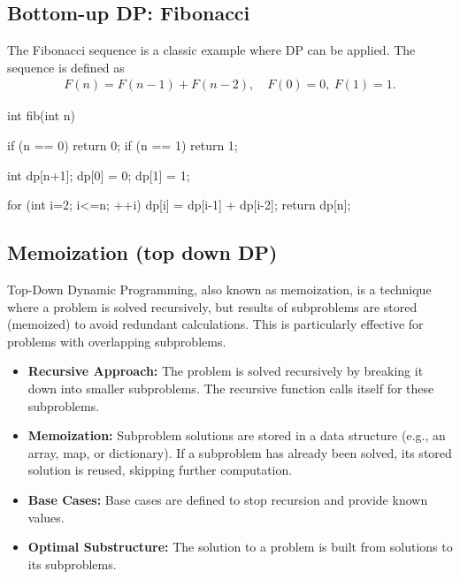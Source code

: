 \documentclass{report}
\begin{document}
\bigbreak \noindent 
\subsection{Bottom-up DP: Fibonacci}
\bigbreak \noindent 
The Fibonacci sequence is a classic example where DP can be applied. The sequence is defined as
\begin{align*}
    F(n) = F(n-1) + F(n-2), \quad F(0) = 0,\ F(1) = 1
.\end{align*}
\bigbreak \noindent 
\begin{cppcode}
    int fib(int n) {
        if (n == 0) return 0;
        if (n == 1) return 1;

        int dp[n+1];
        dp[0] = 0;
        dp[1] = 1;

        for (int i=2; i<=n; ++i) {
            dp[i] = dp[i-1] + dp[i-2];
        }
        return dp[n];
    }
\end{cppcode}

\bigbreak \noindent 
\subsection{Memoization (top down DP)}
\bigbreak \noindent 
Top-Down Dynamic Programming, also known as memoization, is a technique where a problem is solved recursively, but results of subproblems are stored (memoized) to avoid redundant calculations. This is particularly effective for problems with overlapping subproblems.
\bigbreak \noindent 
\begin{itemize}
    \item \textbf{Recursive Approach:} The problem is solved recursively by breaking it down into smaller subproblems.
        \bigbreak \noindent 
        The recursive function calls itself for these subproblems.
    \item \textbf{Memoization:} Subproblem solutions are stored in a data structure (e.g., an array, map, or dictionary).
        \bigbreak \noindent 
        If a subproblem has already been solved, its stored solution is reused, skipping further computation.
    \item \textbf{Base Cases:} Base cases are defined to stop recursion and provide known values.
    \item \textbf{Optimal Substructure:} The solution to a problem is built from solutions to its subproblems.
\end{itemize}

\bigbreak \noindent 
\end{document}
